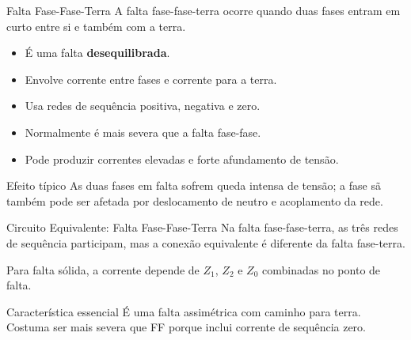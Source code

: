 \documentclass[aspectratio=169,11pt]{beamer}
\begin{document}
\begin{frame}{Falta Fase-Fase-Terra}
  A falta fase-fase-terra ocorre quando duas fases entram em curto entre si e também com a terra.

  \begin{itemize}
    \item É uma falta \textbf{desequilibrada}.
    \item Envolve corrente entre fases e corrente para a terra.
    \item Usa redes de sequência positiva, negativa e zero.
    \item Normalmente é mais severa que a falta fase-fase.
    \item Pode produzir correntes elevadas e forte afundamento de tensão.
  \end{itemize}

  \begin{block}{Efeito típico}
    As duas fases em falta sofrem queda intensa de tensão; a fase sã também pode ser afetada por deslocamento de neutro e acoplamento da rede.
  \end{block}
\end{frame}

\begin{frame}{Circuito Equivalente: Falta Fase-Fase-Terra}
  Na falta fase-fase-terra, as três redes de sequência participam, mas a conexão equivalente é diferente da falta fase-terra.

  \begin{center}
  \end{center}

  Para falta sólida, a corrente depende de $Z_1$, $Z_2$ e $Z_0$ combinadas no ponto de falta.

  \begin{block}{Característica essencial}
    É uma falta assimétrica com caminho para terra. Costuma ser mais severa que FF porque inclui corrente de sequência zero.
  \end{block}
\end{frame}
\end{document}
